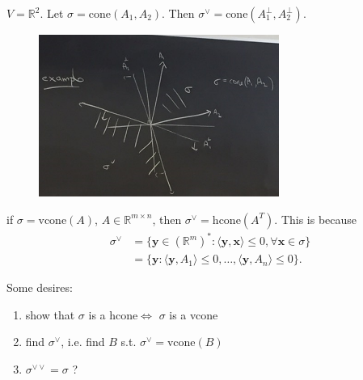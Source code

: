 \documentclass[a4paper,12pt]{amsart}
\newcommand{\RR}{\mathbb{R}}
\newcommand{\bfx}{\mathbf{x}}
\newcommand{\bfy}{\mathbf{y}}
\begin{document}
\begin{Eg}
$V=\RR^2$. Let $\sigma=\text{cone}(A_1,A_2)$. Then $\sigma^{\vee}=\text{cone}(A_1^{\perp},A_2^{\perp})$.
\begin{figure}[h]
\centering
\includegraphics[width=0.7\textwidth]{pic/lec01pic03}
\end{figure}
\end{Eg}
\begin{Remark}
if $\sigma=\text{vcone}(A)$, $A\in\RR^{m\times n}$, then $\sigma^{\vee}=\text{hcone}(A^{T})$. This is because
\begin{align*}
\sigma^{\vee}&=\{\bfy\in(\RR^m)^*:\langle \bfy,\bfx \rangle\leq 0,\forall \bfx\in \sigma\}\\
&=\{\bfy: \langle \bfy,A_1 \rangle\leq 0,\dots,\langle \bfy,A_n \rangle\leq 0\}.
\end{align*}
\end{Remark}
Some desires:
\begin{enumerate}
\item show that $\sigma$ is a hcone$\iff$ $\sigma$ is a vcone
\item  find $\sigma^{\vee}$, i.e. find $B$ s.t. $\sigma^{\vee}=\text{vcone}(B)$
\item $\sigma^{\vee\vee}=\sigma$ ?
\end{enumerate}
\end{document}
